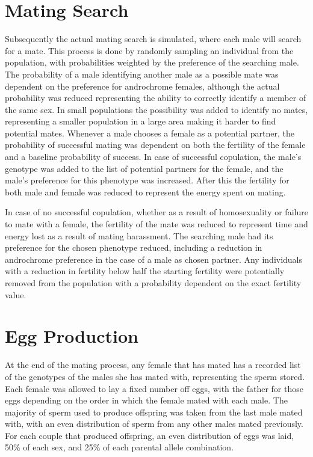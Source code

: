 \documentclass{article}
\begin{document}
\section{Mating Search}
Subsequently the actual mating search is simulated, where each male will search for a mate. This process is done by randomly sampling an individual from the population, with probabilities weighted by the preference of the searching male. The probability of a male identifying another male as a possible mate was dependent on the preference for androchrome females, although the actual probability was reduced representing the ability to correctly identify a member of the same sex. In small populations the possibility was added to identify no mates, representing a smaller population in a large area making it harder to find potential mates. Whenever a male chooses a female as a potential partner, the probability of successful mating was dependent on both the fertility of the female and a baseline probability of success. In case of successful copulation, the male's genotype was added to the list of potential partners for the female, and the male's preference for this phenotype was increased. After this the fertility for both male and female was reduced to represent the energy spent on mating.

In case of no successful copulation, whether as a result of homosexuality or failure to mate with a female, the fertility of the mate was reduced to represent time and energy lost as a result of mating harassment. The searching male had its preference for the chosen phenotype reduced, including a reduction in androchrome preference in the case of a male as chosen partner. Any individuals with a reduction in fertility below half the starting fertility were potentially removed from the population with a probability dependent on the exact fertility value.

\section{Egg Production}
At the end of the mating process, any female that has mated has a recorded list of the genotypes of the males she has mated with, representing the sperm stored. Each female was allowed to lay a fixed number off eggs, with the father for those eggs depending on the order in which the female mated with each male. The majority of sperm used to produce offspring was taken from the last male mated with, with an even distribution of sperm from any other males mated previously. For each couple that produced offspring, an even distribution of eggs was laid, 50\% of each sex, and 25\% of each parental allele combination.
\end{document}
